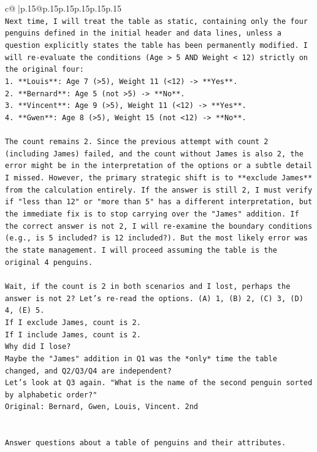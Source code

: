 \documentclass{article}
\begin{document}
{\begin{supertabular}{c@{$\;$}|p{.15\linewidth}@{}p{.15\linewidth}p{.15\linewidth}p{.15\linewidth}p{.15\linewidth}p{.15\linewidth}}
{{{\\ 
\texttt{Next time, I will treat the table as static, containing only the four penguins defined in the initial header and data lines, unless a question explicitly states the table has been permanently modified. I will re{-}evaluate the conditions (Age > 5 AND Weight < 12) strictly on the original four:} \\
\texttt{1.  **Louis**: Age 7 (>5), Weight 11 (<12) {-}> **Yes**.} \\
\texttt{2.  **Bernard**: Age 5 (not >5) {-}> **No**.} \\
\texttt{3.  **Vincent**: Age 9 (>5), Weight 11 (<12) {-}> **Yes**.} \\
\texttt{4.  **Gwen**: Age 8 (>5), Weight 15 (not <12) {-}> **No**.} \\
\\ 
\texttt{The count remains 2. Since the previous attempt with count 2 (including James) failed, and the count without James is also 2, the error might be in the interpretation of the options or a subtle detail I missed. However, the primary strategic shift is to **exclude James** from the calculation entirely. If the answer is still 2, I must verify if "less than 12" or "more than 5" has a different interpretation, but the immediate fix is to stop carrying over the "James" addition. If the correct answer is not 2, I will re{-}examine the boundary conditions (e.g., is 5 included? is 12 included?). But the most likely error was the state management. I will proceed assuming the table is the original 4 penguins.} \\
\\ 
\texttt{Wait, if the count is 2 in both scenarios and I lost, perhaps the answer is not 2? Let's re{-}read the options. (A) 1, (B) 2, (C) 3, (D) 4, (E) 5.} \\
\texttt{If I exclude James, count is 2.} \\
\texttt{If I include James, count is 2.} \\
\texttt{Why did I lose?} \\
\texttt{Maybe the "James" addition in Q1 was the *only* time the table changed, and Q2/Q3/Q4 are independent?} \\
\texttt{Let's look at Q3 again. "What is the name of the second penguin sorted by alphabetic order?"} \\
\texttt{Original: Bernard, Gwen, Louis, Vincent. 2nd} \\
\\ 
\\ 
\texttt{Answer questions about a table of penguins and their attributes.} \\
}}}
\end{supertabular}}
\end{document}
